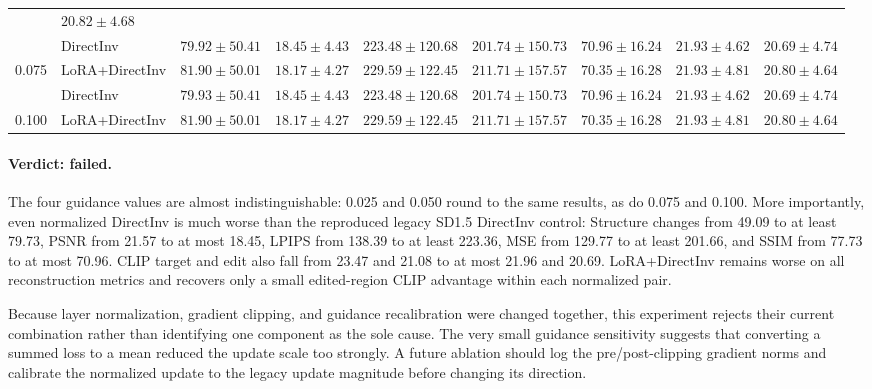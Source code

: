 \documentclass[10pt]{article}
\begin{document}
\begin{table}[htbp]
{\begin{tabular}{llrrrrrrr}
      & $\mathbf{20.82 \pm 4.68}$ \\
    \addlinespace
    0.075 & DirectInv
      & $\mathbf{79.92 \pm 50.41}$ & $\mathbf{18.45 \pm 4.43}$
      & $\mathbf{223.48 \pm 120.68}$ & $\mathbf{201.74 \pm 150.73}$
      & $\mathbf{70.96 \pm 16.24}$ & $\mathbf{21.93 \pm 4.62}$
      & $20.69 \pm 4.74$ \\
    \rowcolor{lorarow}
    0.075 & LoRA+DirectInv
      & $81.90 \pm 50.01$ & $18.17 \pm 4.27$
      & $229.59 \pm 122.45$ & $211.71 \pm 157.57$
      & $70.35 \pm 16.28$ & $\mathbf{21.93 \pm 4.81}$
      & $\mathbf{20.80 \pm 4.64}$ \\
    \addlinespace
    0.100 & DirectInv
      & $\mathbf{79.93 \pm 50.41}$ & $\mathbf{18.45 \pm 4.43}$
      & $\mathbf{223.48 \pm 120.68}$ & $\mathbf{201.74 \pm 150.73}$
      & $\mathbf{70.96 \pm 16.24}$ & $\mathbf{21.93 \pm 4.62}$
      & $20.69 \pm 4.74$ \\
    \rowcolor{lorarow}
    0.100 & LoRA+DirectInv
      & $81.90 \pm 50.01$ & $18.17 \pm 4.27$
      & $229.59 \pm 122.45$ & $211.71 \pm 157.57$
      & $70.35 \pm 16.28$ & $\mathbf{21.93 \pm 4.81}$
      & $\mathbf{20.80 \pm 4.64}$ \\
    \bottomrule
  \end{tabular}%
  }
\end{table}

\paragraph{Verdict: failed.}
The four guidance values are almost indistinguishable: 0.025 and 0.050 round to
the same results, as do 0.075 and 0.100. More importantly, even normalized
DirectInv is much worse than the reproduced legacy SD1.5 DirectInv control:
Structure changes from 49.09 to at least 79.73, PSNR from 21.57 to at most
18.45, LPIPS from 138.39 to at least 223.36, MSE from 129.77 to at least 201.66,
and SSIM from 77.73 to at most 70.96. CLIP target and edit also fall from 23.47
and 21.08 to at most 21.96 and 20.69. LoRA+DirectInv remains worse on all
reconstruction metrics and recovers only a small edited-region CLIP advantage
within each normalized pair.

Because layer normalization, gradient clipping, and guidance recalibration were
changed together, this experiment rejects their current combination rather
than identifying one component as the sole cause. The very small guidance
sensitivity suggests that converting a summed loss to a mean reduced the update
scale too strongly. A future ablation should log the pre/post-clipping gradient
norms and calibrate the normalized update to the legacy update magnitude before
changing its direction.
\end{document}
